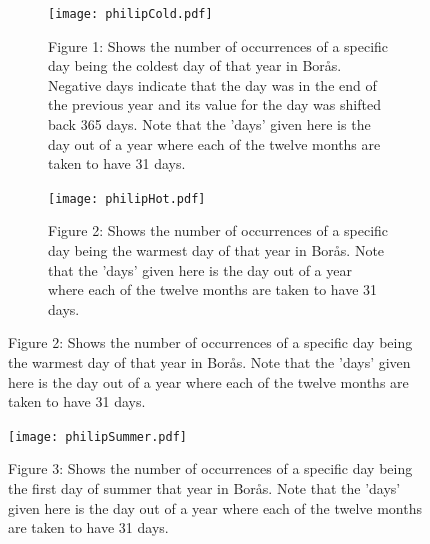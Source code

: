 \documentclass[a4, 12pt]{article}
\begin{document}
\begin{figure}[H]
\centering
\begin{subfigure}{.5\textwidth}
  \centering
  \captionsetup{width = 0.9\linewidth}
  \texttt{[image: philipCold.pdf]}
   \caption*{Figure 1: Shows the number of occurrences of a specific day being the coldest day of that year in Borås. Negative days indicate that the day was in the end of the previous year and its value for the day was shifted back 365 days. Note that the 'days' given here is the day out of a year where each of the twelve months are taken to have 31 days.
   }
\end{subfigure}\hfill
\begin{subfigure}{.5\textwidth}
  \centering
  \captionsetup{width = 0.9\linewidth}
  \texttt{[image: philipHot.pdf]}
  \caption*{Figure 2: Shows the number of occurrences of a specific day being the warmest day of that year in Borås. Note that the 'days' given here is the day out of a year where each of the twelve months are taken to have 31 days. \newline \newline \newline  \mbox{         }}
\end{subfigure}

\end{figure}



\begin{figure}[H]
\centering
\texttt{[image: philipSummer.pdf]}
\caption*{Figure 3: Shows the number of occurrences of a specific day being the first day of summer that year in Borås. Note that the 'days' given here is the day out of a year where each of the twelve months are taken to have 31 days.}
\end{figure} \vspace{0.5cm}





\end{document}
